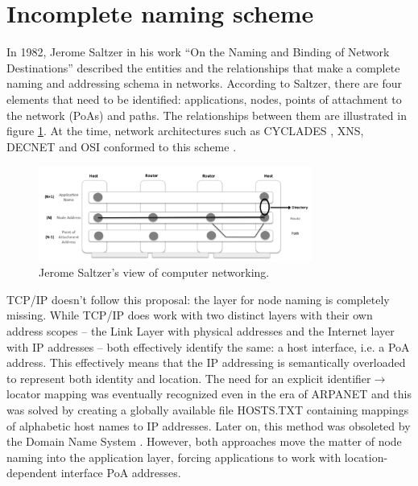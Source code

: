     \section{Incomplete naming scheme}

        In 1982, Jerome Saltzer in his work ``On the Naming and Binding of Network Destinations'' \cite{rfc1498} described the entities and the relationships that make a complete naming and addressing schema in networks. According to Saltzer, there are four elements that need to be identified: applications, nodes, points of attachment to the network (PoAs) and paths. The relationships between them are illustrated in figure \ref{fig:saltzer}. At the time, network architectures such as CYCLADES \cite{Cyclades}, XNS, DECNET and OSI conformed to this scheme \cite{internet_demo}.

        \begin{figure}[H]
            \begin{center}
                \includegraphics[width=0.8\textwidth]{fig/problems_saltzer.png}
              \caption{Jerome Saltzer's view of computer networking.}
              \label{fig:saltzer}
            \end{center}
        \end{figure}

        TCP/IP doesn't follow this proposal: the layer for node naming is completely missing. While TCP/IP does work with two distinct layers with their own address scopes -- the Link Layer with physical addresses and the Internet layer with IP addresses -- both effectively identify the same: a host interface, i.e. a PoA address. This effectively means that the IP addressing is semantically overloaded to represent both identity and location. The need for an explicit identifier$\rightarrow$locator mapping was eventually recognized even in the era of ARPANET and this was solved by creating a globally available file HOSTS.TXT containing mappings of alphabetic host names to IP addresses. Later on, this method was obsoleted by the Domain Name System \cite{rfc1034}. However, both approaches move the matter of node naming into the application layer, forcing applications to work with location-dependent interface PoA addresses.

